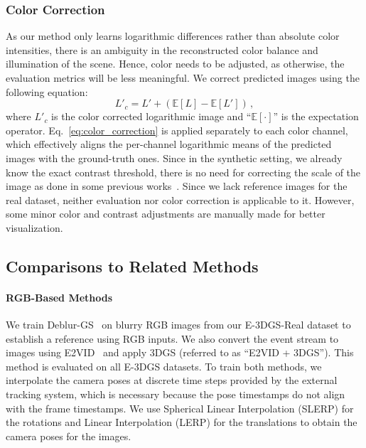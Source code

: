 \subsubsection{Color Correction} 
As our method only learns logarithmic differences rather than absolute color intensities, there is an ambiguity in the reconstructed color balance and illumination of the scene. Hence, color needs to be adjusted, as otherwise, the evaluation metrics will be less meaningful. We correct predicted images using the following equation: 
\begin{equation}
    L'_c = L' + (\mathbb{E}[L] - \mathbb{E}[L']) \mathrm{\,,}
    \label{eq:color_correction}
\end{equation}
where $L'_c$ is the color corrected logarithmic image and ``$\mathbb{E}[\cdot]$'' is the expectation operator. 
Eq.~\eqref{eq:color_correction} is applied separately to each color channel, which effectively aligns the per-channel logarithmic means of the predicted images with the ground-truth ones. 
Since in the synthetic setting, we already know the exact contrast threshold, there is no need for correcting the scale of the image as done in some previous works~\cite{eventnerf,robust_enerf}. 
Since we lack reference images for the real dataset, neither evaluation nor color correction is applicable to it. However, some minor color and contrast adjustments are manually made for better visualization. 

\subsection{Comparisons to Related Methods}
\label{subsec:comparisons}


\paragraph{RGB-Based Methods} 
We train Deblur-GS~\cite{deblurgs} on blurry RGB images from our E-3DGS-Real dataset to establish a reference using RGB inputs. 
We also convert the event stream to images using E2VID~\cite{e2vid} and apply 3DGS (referred to as ``E2VID + 3DGS''). 
This method is evaluated on all E-3DGS datasets. 
To train both methods, we interpolate the camera poses at discrete time steps provided by the external tracking system, which is necessary because the pose timestamps do not align with the frame timestamps. 
We use Spherical Linear Interpolation (SLERP) for the rotations and Linear Interpolation (LERP) for the translations to obtain the camera poses for the images. 

